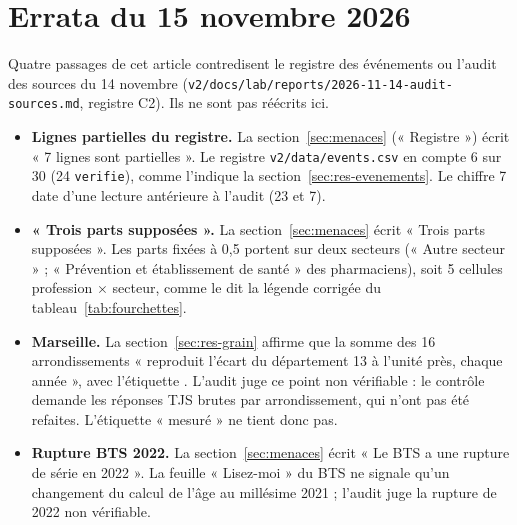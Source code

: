 \documentclass[11pt]{article}
\begin{document}
\section{Errata du 15 novembre 2026}\label{sec:errata}
Quatre passages de cet article contredisent le registre des événements ou l'audit des sources du 14 novembre
(\texttt{v2/docs/lab/reports/2026-11-14-audit-sources.md}, registre C2). Ils ne sont pas réécrits ici.
\begin{itemize}
  \item \textbf{Lignes partielles du registre.} La section~\ref{sec:menaces} (« Registre ») écrit « 7 lignes sont
  partielles ». Le registre \texttt{v2/data/events.csv} en compte 6\mesure{} sur 30 (24 \texttt{verifie}),
  comme l'indique la section~\ref{sec:res-evenements}. Le chiffre 7 date d'une lecture antérieure à l'audit
  (23 et 7).
  \item \textbf{« Trois parts supposées ».} La section~\ref{sec:menaces} écrit « Trois parts supposées ». Les parts
  fixées à 0,5\suppose{} portent sur deux secteurs (« Autre secteur » ; « Prévention et établissement de santé »
  des pharmaciens), soit 5\mesure{} cellules profession $\times$ secteur, comme le dit la légende corrigée du
  tableau~\ref{tab:fourchettes}.
  \item \textbf{Marseille.} La section~\ref{sec:res-grain} affirme que la somme des 16 arrondissements
  « reproduit l'écart du département 13 à l'unité près, chaque année », avec l'étiquette \mesure. L'audit juge ce
  point non vérifiable : le contrôle demande les réponses TJS brutes par arrondissement, qui n'ont pas été
  refaites. L'étiquette « mesuré » ne tient donc pas.
  \item \textbf{Rupture BTS 2022.} La section~\ref{sec:menaces} écrit « Le BTS a une rupture de série en 2022 ».
  La feuille « Lisez-moi » du BTS ne signale qu'un changement du calcul de l'âge au millésime 2021 ; l'audit juge
  la rupture de 2022 non vérifiable.
\end{itemize}



\end{document}
